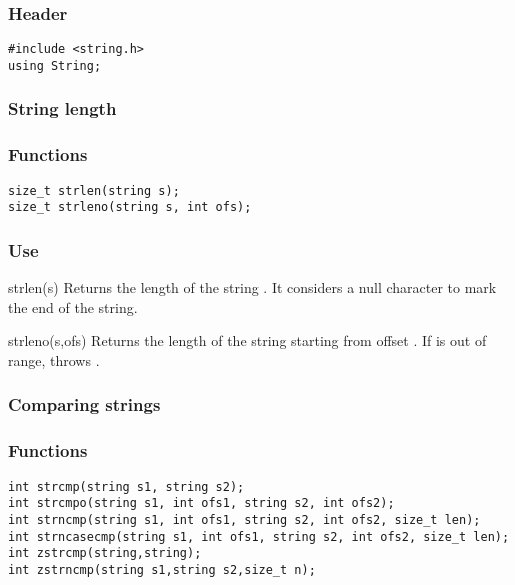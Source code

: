 \subsubsection*{Header}
\begin{verbatim}
#include <string.h>
using String;
\end{verbatim}


\subsubsection*{String length}
\subsubsection*{Functions}
\begin{verbatim}
size_t strlen(string s);
size_t strleno(string s, int ofs);
\end{verbatim}

\subsubsection*{Use}

\begin{defun}{strlen}{(s)}
Returns the length of the string .  It considers a null
character to mark the end of the string.
\end{defun}

\begin{defun}{strleno}{(s,ofs)}
Returns the length of the string starting from offset .  If
 is out of range,  throws
.
\end{defun}

\subsubsection*{Comparing strings}
\subsubsection*{Functions}
\begin{verbatim}
int strcmp(string s1, string s2);
int strcmpo(string s1, int ofs1, string s2, int ofs2);
int strncmp(string s1, int ofs1, string s2, int ofs2, size_t len);
int strncasecmp(string s1, int ofs1, string s2, int ofs2, size_t len);
int zstrcmp(string,string);
int zstrncmp(string s1,string s2,size_t n);
\end{verbatim}

